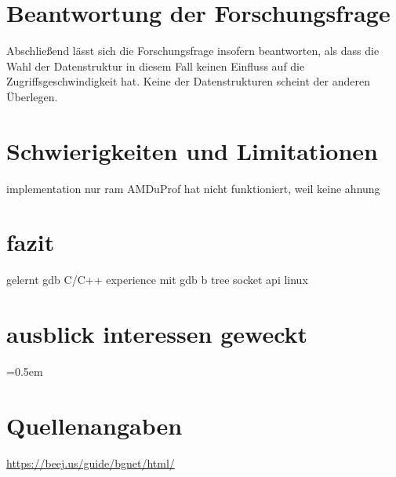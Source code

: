 \documentclass[11pt,a4paper]{article}
\begin{document}
\section{Beantwortung der Forschungsfrage}

Abschließend lässt sich die Forschungsfrage insofern beantworten, als dass
die Wahl der Datenstruktur in diesem Fall keinen Einfluss auf die Zugriffsgeschwindigkeit
hat. Keine der Datenstrukturen scheint der anderen Überlegen.

\section{Schwierigkeiten und Limitationen}

implementation
nur ram
AMDuProf hat nicht funktioniert, weil keine ahnung

\section{fazit}

gelernt
gdb
C/C++ experience mit gdb
b tree
socket api linux

\section{ausblick interessen geweckt}

% 

\begin{bchart}[min=0, max=30, scale=1.9]
    \smallskip
    \smallskip
    \smallskip
    \smallskip
    \smallskip
\end{bchart}

\clearpage

\cite{boeing_engineers}
\cite{indian_overview}
\cite{sql_ideas}
\cite{avl_tree_wikipedia}

\emergencystretch=0.5em

\section{Quellenangaben}

\url{https://beej.us/guide/bgnet/html/}

\printbibliography[title={Literaturverzeichnis}]
\end{document}
